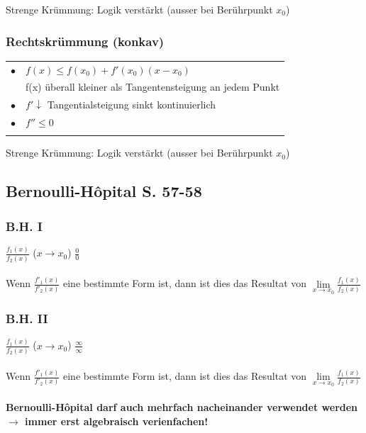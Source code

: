 			Strenge Krümmung: Logik verstärkt (ausser bei Berührpunkt $x_0$)
			
			\subsubsection{Rechtskrümmung (konkav)}
			\begin{tabular}{ll}
			$\bullet$ & $f(x) \leq f(x_0) + f'(x_0)(x-x_0)$ \\
			& f(x) überall kleiner als Tangentensteigung an jedem Punkt \\
			$\bullet$ & $f' \downarrow$ Tangentialsteigung sinkt kontinuierlich \\
			$\bullet$ & $f'' \leq 0$ \\
			\\
			\end{tabular}
			
			Strenge Krümmung: Logik verstärkt (ausser bei Berührpunkt $x_0$)				
			
			
		\subsection{Bernoulli-Hôpital S. 57-58}	
		\subsubsection{B.H. I}
		$\frac{f_1(x)}{f_2(x)}$ \quad ($ x\rightarrow x_0$) \quad $\frac{0}{0}$ \\
		\\
		Wenn $\frac{f'_1(x)}{f'_2(x)}$ eine bestimmte Form ist, dann ist dies das Resultat von $\lim \limits_{x \to x_0} \frac{f_1(x)}{f_2(x)}$
		
		\subsubsection{B.H. II}	
		$\frac{f_1(x)}{f_2(x)}$ \quad ($x\rightarrow x_0$) \quad $\frac{\infty}{\infty}$		\\
		\\
		Wenn $\frac{f'_1(x)}{f'_2(x)}$ eine bestimmte Form ist, dann ist dies das Resultat von $\lim \limits_{x \to x_0} \frac{f_1(x)}{f_2(x)}$ \\
		\\
		\textbf{Bernoulli-Hôpital darf auch mehrfach nacheinander verwendet werden $\rightarrow$ immer erst algebraisch verienfachen!} 
		
